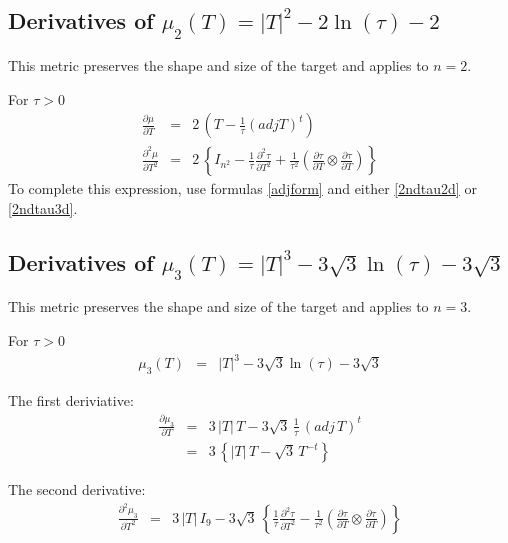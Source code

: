 \documentclass{report}
\begin{document}
\subsection{Derivatives of $\mu_2(T)=|T|^2 - 2 \ln(\tau) - 2$}

\noindent This metric preserves the shape and size of the target and applies
to $n=2$. \newline

\noindent For $\tau>0$
\begin{eqnarray}
\frac{\partial \mu}{\partial T} & = & 2 \, \left( T - \frac{1}{\tau} (adj T)^t \right) \\
\frac{\partial^2 \mu}{\partial T^2} & = & 2 \, \left\{ I_{n^2}  - \frac{1}{\tau} \frac{\partial^2 \tau}{\partial T^2} + \frac{1}{\tau^2} \left( \frac{\partial \tau}{\partial T} \otimes \frac{\partial \tau}{\partial T} \right) \right\}
\end{eqnarray}
To complete this expression, use formulas \ref{adjform} and either 
\ref{2ndtau2d} or \ref{2ndtau3d}. \newline

\subsection{Derivatives of $\mu_3(T)=|T|^3 - 3 \sqrt{3} \ln(\tau) - 3 \sqrt{3}$}

\noindent This metric preserves the shape and size of the target and applies
to $n=3$. \newline

\noindent For $\tau>0$
\begin{eqnarray}
\mu_3(T) & = & |T|^3 - 3 \sqrt{3} \ln(\tau) - 3 \sqrt{3} 
\end{eqnarray}

\noindent The first deriviative:
\begin{eqnarray}
\frac{\partial \mu_3}{\partial T} & = & 3 \, |T| \, T - 3 \sqrt{3} \, \frac{1}{\tau} \, (adj \, T)^t \\
 & = & 3 \, \left\{ |T| \, T - \sqrt{3} \, T^{-t} \right\}
\end{eqnarray}

\noindent The second derivative:
\begin{eqnarray}
\frac{\partial^2 \mu_3}{\partial T^2} & = & 3 \, |T| \, I_{9} - 3 \sqrt{3} \, \left\{ \frac{1}{\tau} \frac{\partial^2 \tau}{\partial T^2} - \frac{1}{\tau^2} \left( \frac{\partial \tau}{\partial T} \otimes \frac{\partial \tau}{\partial T} \right) \right\}
\end{eqnarray}
\end{document}
